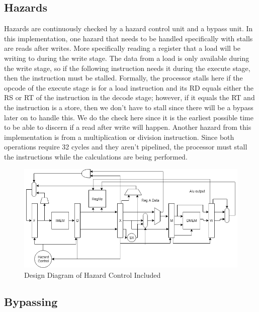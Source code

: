 \documentclass[letterpaper]{article} %
\begin{document}
\subsection*{Hazards}

Hazards are continuously checked by a hazard control unit and a bypass unit. In this implementation, one hazard that needs to be handled specifically with stalls are reads after writes. More specifically reading a register that a load will be writing to during the write stage. The data from a load is only available during the write stage, so if the following instruction needs it during the execute stage, then the instruction must be stalled. Formally, the processor stalls here if the opcode of the execute stage is for a load instruction and its RD equals either the RS or RT of the instruction in the decode stage; however, if it equals the RT and the instruction is a store, then we don't have to stall since there will be a bypass later on to handle this. We do the check here since it is the earliest possible time to be able to discern if a read after write will happen. Another hazard from this implementation is from a multiplication or division instruction. Since both operations require 32 cycles and they aren't pipelined, the processor must stall the instructions while the calculations are being performed.

\newpage

\begin{figure}[htb!]
    \centering
    \includegraphics[width=.7\textwidth]{hazardDiagram.png}
    \caption{Design Diagram of Hazard Control Included}
\end{figure}

\subsection*{Bypassing}
\end{document}
